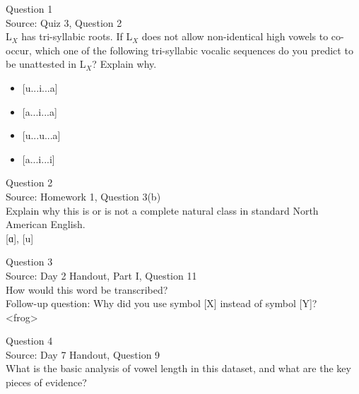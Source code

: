 \documentclass[12pt]{article}
\begin{document}
{\large Question 1}\\

Source: Quiz 3, Question 2\\

L$_X$ has tri-syllabic roots. If L$_X$ does not allow non-identical high vowels to co-occur, which one of the following tri-syllabic vocalic sequences do you predict to be unattested in L$_X$? Explain why.\\

\begin{itemize} \item {[u...i...a]} \item {[a...i...a]} \item {[u...u...a]} \item {[a...i...i]} \end{itemize}


\newpage

{\large Question 2}\\

Source: Homework 1, Question 3(b)\\

Explain why this is or is not a complete natural class in standard North American English.\\

{[ɑ]}, {[u]}


\newpage

{\large Question 3}\\

Source: Day 2 Handout, Part I, Question 11\\

How would this word be transcribed?\\ Follow-up question: Why did you use symbol [X] instead of symbol [Y]?\\

<frog>


\newpage

{\large Question 4}\\

Source: Day 7 Handout, Question 9\\

What is the basic analysis of vowel length in this dataset, and what are the key pieces of evidence?\\
\end{document}
